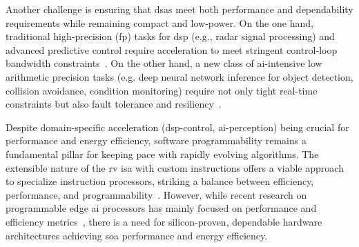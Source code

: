 Another challenge is ensuring that \glspl{dsa} meet both performance and dependability requirements while remaining compact and low-power.
%
On the one hand, traditional high-precision (\gls{fp}) tasks for \gls{dsp} (e.g., radar signal processing) and advanced predictive control require acceleration to meet stringent control-loop bandwidth constraints~\cite{islayem2024hardware, jhung2023hardware}. %
%
On the other hand, a new class of \gls{ai}-intensive low arithmetic precision tasks (e.g. deep neural network inference for object detection, collision avoidance, condition monitoring) require not only tight real-time constraints but also fault tolerance and resiliency~\cite{islayem2024hardware}.

Despite domain-specific acceleration (\gls{dsp}-control, \gls{ai}-perception) being crucial for performance and energy efficiency, software programmability remains a fundamental pillar for keeping pace with rapidly evolving algorithms. The extensible nature of the \gls{rv} \gls{isa} with custom instructions offers a viable approach to specialize instruction processors, striking a balance between efficiency, performance, and programmability~\cite{valenteHeterogeneousRISCVBased2024, UMBRELLA_TCASI_1}. However, while recent research on programmable edge \gls{ai} processors has mainly focused on performance and efficiency metrics~\cite{valenteHeterogeneousRISCVBased2024, xu2023ultra, sun202340nm, juSystolicNeuralCPU2023}, there is a need for silicon-proven, dependable hardware architectures achieving \gls{soa} performance and energy efficiency.%


